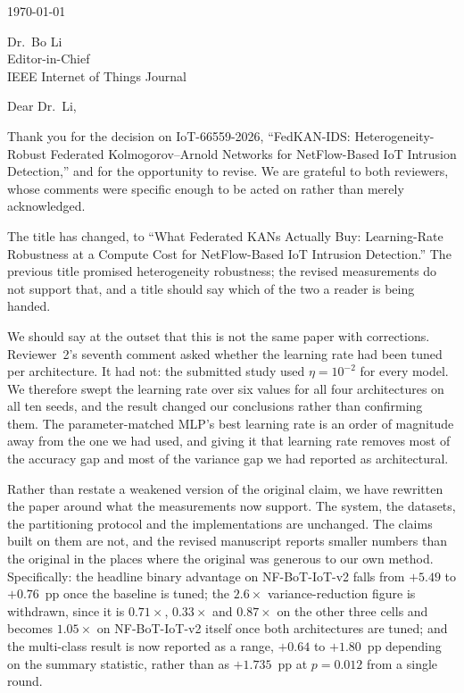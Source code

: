 \documentclass[11pt]{article}
\begin{document}
\hfill \today

\bigskip
Dr.\ Bo Li\\
Editor-in-Chief\\
IEEE Internet of Things Journal

\bigskip
Dear Dr.\ Li,

Thank you for the decision on IoT-66559-2026, ``FedKAN-IDS: Heterogeneity-Robust Federated
Kolmogorov--Arnold Networks for NetFlow-Based IoT Intrusion Detection,'' and for the
opportunity to revise. We are grateful to both reviewers, whose comments were specific
enough to be acted on rather than merely acknowledged.

The title has changed, to ``What Federated KANs Actually Buy: Learning-Rate Robustness at a
Compute Cost for NetFlow-Based IoT Intrusion Detection.'' The previous title promised
heterogeneity robustness; the revised measurements do not support that, and a title should
say which of the two a reader is being handed.

We should say at the outset that this is not the same paper with corrections. Reviewer~2's
seventh comment asked whether the learning rate had been tuned per architecture. It had
not: the submitted study used $\eta = 10^{-2}$ for every model. We therefore swept the
learning rate over six values for all four architectures on all ten seeds, and the result
changed our conclusions rather than confirming them.
The parameter-matched MLP's best learning rate is an order of magnitude away from the one
we had used, and giving it that learning rate removes most of the accuracy gap and most of
the variance gap we had reported as architectural.

Rather than restate a weakened version of the original claim, we have rewritten the paper
around what the measurements now support. The system, the datasets, the partitioning
protocol and the implementations are unchanged. The claims built on them are not, and the
revised manuscript reports smaller numbers than the original in the places where the
original was generous to our own method. Specifically: the headline binary advantage on
NF-BoT-IoT-v2 falls from $+5.49$ to $+0.76$~pp once the baseline is tuned; the
$2.6\times$ variance-reduction figure is withdrawn, since it is $0.71\times$, $0.33\times$ and
$0.87\times$ on the other three cells and becomes $1.05\times$ on NF-BoT-IoT-v2 itself once
both architectures are tuned; and the multi-class result is now reported as a range,
$+0.64$ to $+1.80$~pp depending on the summary statistic, rather than as $+1.735$~pp at
$p=0.012$ from a single round.
\end{document}
